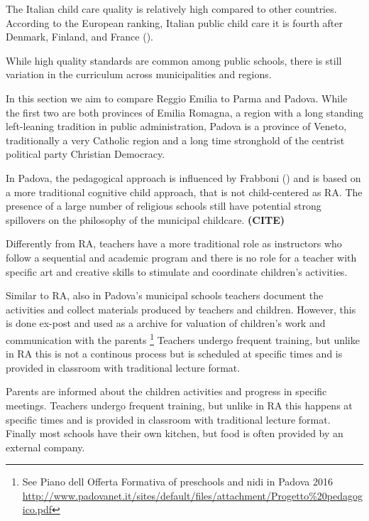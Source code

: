 \documentclass[12pt]{article}
\begin{document}
The Italian child care quality is relatively high compared to other countries. According to the European ranking, Italian public child care it is fourth after Denmark, Finland, and France (\cite{DeHenau2008}).

While high quality standards are common among public schools, there is still variation in the curriculum across municipalities and regions.

In this section we aim to compare Reggio Emilia to Parma and Padova. While the first two are both provinces of Emilia Romagna, a region with a long standing left-leaning tradition in public administration, Padova is a province of Veneto, traditionally a very Catholic region and a long time stronghold of the centrist political party Christian Democracy.

In Padova, the pedagogical approach is influenced by Frabboni (\cite{Frabboni1999}) and is based on a more traditional cognitive child approach, that is not child-centered as RA. The presence of a large number of religious schools still have potential strong spillovers on the philosophy of the municipal childcare. \textbf{(CITE)}

Differently from RA, teachers have a more traditional role as instructors who follow a sequential and academic program and there is no role for a teacher with specific art and creative skills to stimulate and coordinate children's activities.

Similar to RA, also in Padova's municipal schools teachers document the activities and collect materials produced by teachers and children. However, this is done ex-post and used as a archive for valuation of children's work and communication with the parents \footnote{See Piano dell Offerta Formativa of preschools and nidi in Padova 2016 \url{http://www.padovanet.it/sites/default/files/attachment/Progetto\%20pedagogico.pdf}} Teachers undergo frequent training, but unlike in RA this is not a continous process but is scheduled at specific times and is provided in classroom with traditional lecture format.

Parents are informed about the children activities and progress in specific meetings. Teachers undergo frequent training, but unlike in RA this happens at specific times and is provided in classroom with traditional lecture format. Finally most schools have their own kitchen, but food is often provided by an external company. 
\end{document}
